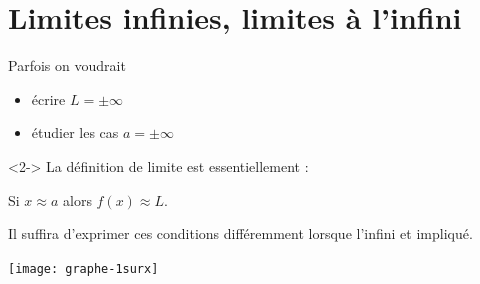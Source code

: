 \section{Limites infinies, limites à l'infini}
\begin{frame}
  \begin{minipage}{0.49\linewidth}
 Parfois on voudrait
 \begin{itemize}
 \item écrire \(L = \pm \infty\)
 \item étudier les cas \(a = \pm \infty\)
 \end{itemize}
 \begin{remark}<2->
   La définition de limite est essentiellement :
   \begin{center}
     Si $x \approx a$ alors \(f(x)\approx L\).
   \end{center}

   Il suffira d'exprimer ces conditions différemment lorsque l'infini et impliqué.
 \end{remark}
\end{minipage}
\begin{minipage}{0.49\linewidth}
  \begin{center}
    \texttt{[image: graphe-1surx]}%
  \end{center}
\end{minipage}
\end{frame}

